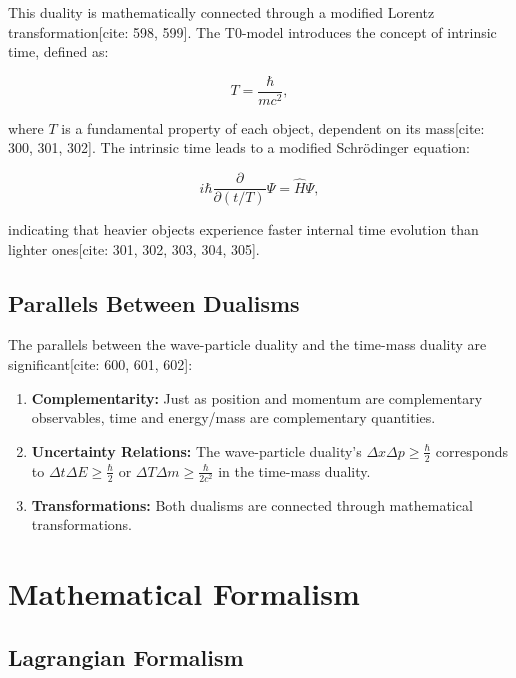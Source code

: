 \documentclass[a4paper,12pt]{article}
\theoremstyle{definition}
\theoremstyle{remark}
\begin{document}
	This duality is mathematically connected through a modified Lorentz transformation[cite: 598, 599]. The T0-model introduces the concept of intrinsic time, defined as:
	
	\begin{equation}
		T = \frac{\hbar}{m c^2},
	\end{equation}
	
	where \( T \) is a fundamental property of each object, dependent on its mass[cite: 300, 301, 302]. The intrinsic time leads to a modified Schrödinger equation:
	
	\begin{equation}
		i\hbar \frac{\partial}{\partial (t/T)} \Psi = \hat{H} \Psi,
	\end{equation}
	
	indicating that heavier objects experience faster internal time evolution than lighter ones[cite: 301, 302, 303, 304, 305].
	
	\subsection{Parallels Between Dualisms}
	
	The parallels between the wave-particle duality and the time-mass duality are significant[cite: 600, 601, 602]:
	
	\begin{enumerate}
		\item \textbf{Complementarity:} Just as position and momentum are complementary observables, time and energy/mass are complementary quantities.
		\item \textbf{Uncertainty Relations:} The wave-particle duality's \( \Delta x \Delta p \geq \frac{\hbar}{2} \) corresponds to \( \Delta t \Delta E \geq \frac{\hbar}{2} \) or \( \Delta T \Delta m \geq \frac{\hbar}{2 c^2} \) in the time-mass duality.
		\item \textbf{Transformations:} Both dualisms are connected through mathematical transformations.
	\end{enumerate}
	
	\section{Mathematical Formalism}
	
	\subsection{Lagrangian Formalism}
	
\end{document}
